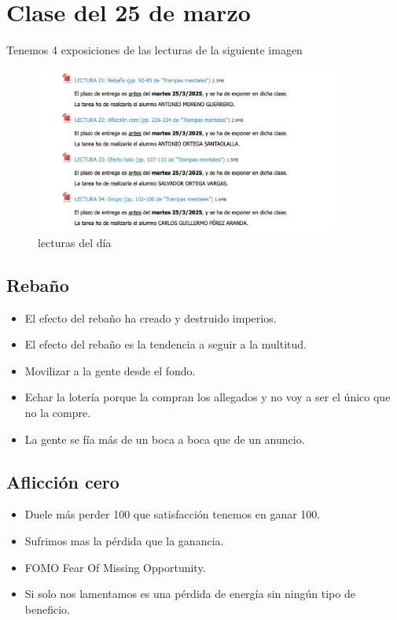 \documentclass[12pt, a4paper, twoside]{article}
\begin{document}
\section{Clase del 25 de marzo}

Tenemos 4 exposiciones de las lecturas de la siguiente imagen
\begin{figure}[h]
    \centering
    \includegraphics[width=0.9\textwidth]{./Images/0325.jpg}
    \caption{lecturas del día}
\end{figure}

\subsection{Rebaño}

\begin{itemize}
    \item El efecto del rebaño ha creado y destruido imperios.
    \item El efecto del rebaño es la tendencia a seguir a la multitud.
    \item Movilizar a la gente desde el fondo.
    \item Echar la lotería porque la compran los allegados y no voy a ser el único que no la compre.
    \item La gente se fía más de un boca a boca que de un anuncio.
\end{itemize}



\subsection{Aflicción cero}

\begin{itemize}
    \item Duele más perder 100 que satisfacción tenemos en ganar 100.
    \item Sufrimos mas la pérdida que la ganancia.
    \item FOMO Fear Of Missing Opportunity.
    \item Si solo nos lamentamos es una pérdida de energía sin ningún tipo de beneficio.
\end{itemize}
\end{document}
